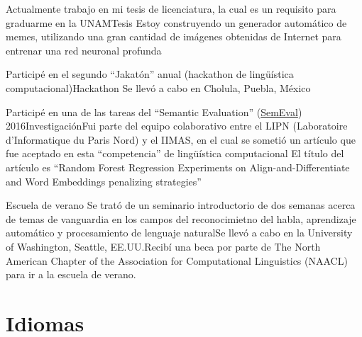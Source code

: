 \documentclass[11pt,a4paper,sans]{moderncv} %
\begin{document}
        {Actualmente trabajo en mi tesis de licenciatura, la cual es un requisito para graduarme en la UNAM}{Tesis}
        {Estoy construyendo un generador automático de memes, utilizando una gran cantidad de imágenes obtenidas de Internet para entrenar una red neuronal profunda}
        {}{}

        {Participé en el segundo ``Jakatón'' anual (hackathon de lingüística computacional)}{Hackathon}
        {Se llevó a cabo en Cholula, Puebla, México}{}{}

        {Participé en una de las tareas del ``Semantic Evaluation'' (\href{http://alt.qcri.org/semeval2016/}{SemEval}) 2016}{Investigación}{Fui parte del equipo colaborativo entre el LIPN (Laboratoire d'Informatique du Paris Nord) y el IIMAS, en el cual se sometió un artículo que fue aceptado en esta ``competencia'' de lingüística computacional}
        {El título del artículo es ``Random Forest Regression Experiments on Align-and-Differentiate and Word Embeddings penalizing strategies''}
        {}

        {Escuela de verano}
        {Se trató de un seminario introductorio de dos semanas acerca de temas de vanguardia en los campos del reconocimietno del habla, aprendizaje automático y procesamiento de lenguaje natural}{Se llevó a cabo en la University of Washington, Seattle, EE.UU.}{Recibí una beca por parte de The North American Chapter of the Association for Computational Linguistics (NAACL) para ir a la escuela de verano.}



\section{Idiomas}

\end{document}
